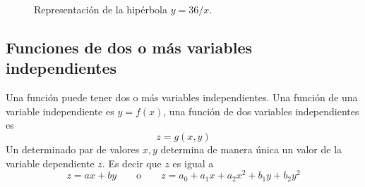 \begin{figure}[htbp]
    \centering 
    \begin{subfigure}[b]{0.48\textwidth}
        \centering
    \end{subfigure}
    \hfill 
    \begin{subfigure}[b]{0.48\textwidth}
        \centering
    \end{subfigure}

    \caption{Representación de la hipérbola $y = 36/x$.}
    \label{grafico_ejercicios_1.1.x_c}
\end{figure}



\clearpage
\subsection{Funciones de dos o más variables independientes}

Una función puede tener dos o más variables independientes. Una función de una variable independiente es \(y=f(x)\), una función de dos variables independientes es
\[
z=g(x,y)
\]
Un determinado par de valores \(x,y\) determina de manera única un valor de la variable dependiente \(z\). Es decir que \(z\) es igual a 
\[
z=ax+by \qquad \text{o} \qquad z = a_0+a_1x+a_2x^2+b_1y+ b_2y^2
\]

